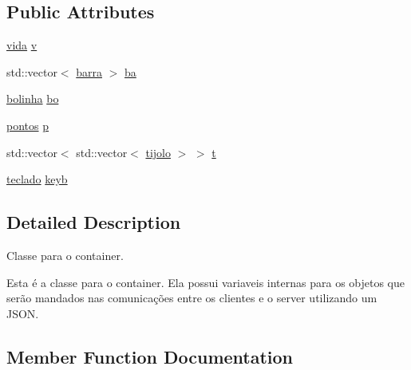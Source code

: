\subsection*{Public Attributes}
\begin{DoxyCompactItemize}
\item 
\hyperlink{classvida}{vida} \hyperlink{classcontainer_a4325e82e5cadf6795d352eff867701ea}{v}
\item 
std\+::vector$<$ \hyperlink{classbarra}{barra} $>$ \hyperlink{classcontainer_ad22e7caec50674c234eff9f4a52e0d2a}{ba}
\item 
\hyperlink{classbolinha}{bolinha} \hyperlink{classcontainer_a7f91f9ac48a9830e1ce05cd441c21763}{bo}
\item 
\hyperlink{classpontos}{pontos} \hyperlink{classcontainer_acd76736c06d59233703b8df3bed61d69}{p}
\item 
std\+::vector$<$ std\+::vector$<$ \hyperlink{classtijolo}{tijolo} $>$ $>$ \hyperlink{classcontainer_a84e973e8af87828958dff85ad4053b03}{t}
\item 
\hyperlink{classteclado}{teclado} \hyperlink{classcontainer_a22d0cefc9aa2a60d8c0d07b37613d266}{keyb}
\end{DoxyCompactItemize}


\subsection{Detailed Description}
Classe para o container. 

Esta é a classe para o container. Ela possui variaveis internas para os objetos que serão mandados nas comunicações entre os clientes e o server utilizando um J\+S\+ON. 

\subsection{Member Function Documentation}
